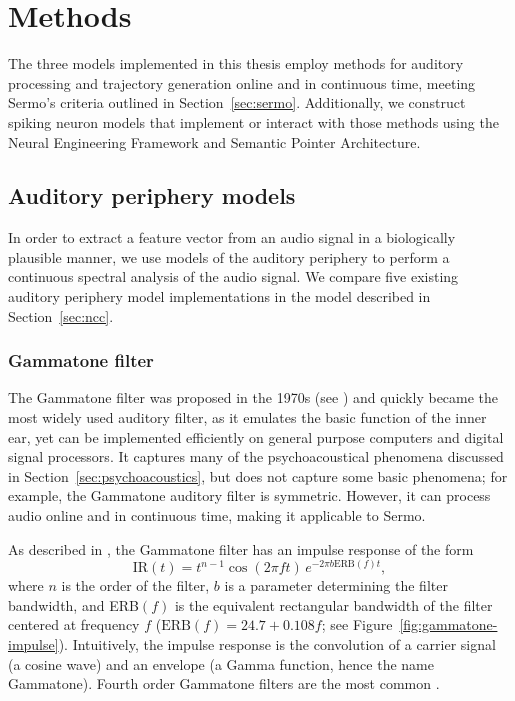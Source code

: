 \chapter{Methods}
\label{chapt:methods}

The three models implemented
in this thesis employ methods
for auditory processing
and trajectory generation
online and in continuous time,
meeting Sermo's criteria
outlined in Section~\ref{sec:sermo}.
Additionally,
we construct spiking neuron models
that implement or interact with those methods
using the Neural Engineering Framework
and Semantic Pointer Architecture.

\section{Auditory periphery models}
\label{sec:periphery-models}

In order to extract a feature vector
from an audio signal
in a biologically plausible manner,
we use models of the auditory periphery
to perform a continuous spectral analysis
of the audio signal.
We compare five existing
auditory periphery model implementations
in the model described in
Section~\ref{sec:ncc}.

\subsection{Gammatone filter}

The Gammatone filter was proposed
in the 1970s
(see \citealt{johannesma1972,deboer1975,patterson1976})
and quickly became
the most widely used auditory filter,
as it emulates the basic function
of the inner ear,
yet can be implemented efficiently
on general purpose computers
and digital signal processors.
It captures many of the
psychoacoustical phenomena discussed
in Section~\ref{sec:psychoacoustics},
but does not capture some basic phenomena;
for example, the Gammatone auditory filter is symmetric.
However,
it can process audio online
and in continuous time,
making it applicable to Sermo.


As described in \citet{patterson1976},
the Gammatone filter has
an impulse response of the form
\begin{equation*}
  \text{IR}(t) = t^{n-1} \cos(2 \pi f t) \, e^{-2 \pi b \text{ERB}(f) t},
\end{equation*}
where $n$ is the order of the filter,
$b$ is a parameter determining the filter bandwidth,
and ERB$(f)$ is the equivalent rectangular bandwidth
of the filter centered at frequency $f$
($\text{ERB}(f) = 24.7 + 0.108f$;
see Figure~\ref{fig:gammatone-impulse}).
Intuitively, the impulse response
is the convolution of a
carrier signal (a cosine wave)
and an envelope
(a Gamma function, hence the name Gammatone).
Fourth order Gammatone filters
are the most common
\citep{patterson1992}.

